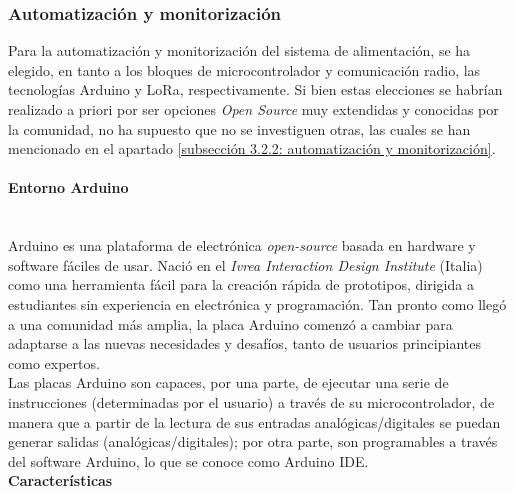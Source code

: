 \documentclass[12pt]{article}
\newcommand{\subsubsubsection}[1]{\paragraph{#1}\mbox{}\\}
\begin{document}
	\subsubsection{Automatización y monitorización}
	\label{subsubsection: automatizacion y monitorizacion}
	
	\noindent Para la automatización y monitorización del sistema de alimentación, se ha elegido, en tanto a los bloques de microcontrolador y  comunicación radio, las tecnologías Arduino y LoRa, respectivamente. Si bien estas elecciones se habrían realizado a priori por ser opciones \textit{Open Source} muy extendidas y conocidas por la comunidad, no ha supuesto que no se investiguen otras, las cuales se han mencionado en el apartado \ref{subsección 3.2.2: automatización y monitorización}.
	
	\subsubsubsection{Entorno Arduino}
	

	\noindent Arduino es una plataforma de electrónica \textit{open-source} basada en hardware y software fáciles de usar. Nació en el \textit{Ivrea Interaction Design Institute} (Italia) como una herramienta fácil para la creación rápida de prototipos, dirigida a estudiantes sin experiencia en electrónica y programación. Tan pronto como llegó a una comunidad más amplia, la placa Arduino comenzó a cambiar para adaptarse a las nuevas necesidades y desafíos, tanto de usuarios principiantes como expertos. \\
	
	\noindent Las placas Arduino son capaces, por una parte, de ejecutar una serie de instrucciones (determinadas por el usuario) a través de su microcontrolador, de manera que a partir de la lectura de sus entradas analógicas/digitales se puedan generar salidas (analógicas/digitales); por otra parte, son programables a través del software Arduino, lo que se conoce como Arduino IDE. \\
	
	\noindent \textbf{Características} \\
	
\end{document}
